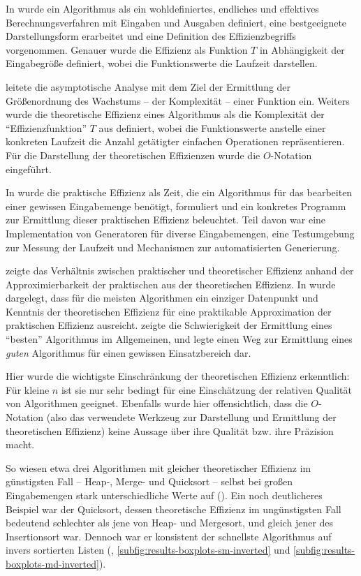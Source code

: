 In  wurde ein Algorithmus als ein wohldefiniertes, endliches und effektives Berechnungsverfahren mit Eingaben und Ausgaben definiert, eine bestgeeignete Darstellungsform erarbeitet und eine Definition des Effizienzbegriffs vorgenommen. Genauer wurde die Effizienz als Funktion $T$ in Abhängigkeit der Eingabegröße definiert, wobei die Funktionswerte die Laufzeit darstellen.

 leitete die asymptotische Analyse mit dem Ziel der Ermittlung der Größenordnung des Wachstums -- der Komplexität -- einer Funktion ein. Weiters wurde die theoretische Effizienz eines Algorithmus als die Komplexität der \enquote{Effizienzfunktion} $T$ aus  definiert, wobei die Funktionswerte anstelle einer konkreten Laufzeit die Anzahl getätigter einfachen Operationen repräsentieren. Für die Darstellung der theoretischen Effizienzen wurde die $O$-Notation eingeführt.

In  wurde die praktische Effizienz als Zeit, die ein Algorithmus für das bearbeiten einer gewissen Eingabemenge benötigt, formuliert und ein konkretes Programm zur Ermittlung dieser praktischen Effizienz beleuchtet. Teil davon war eine Implementation von Generatoren für diverse Eingabemengen, eine Testumgebung zur Messung der Laufzeit und Mechanismen zur automatisierten Generierung.

 zeigte das Verhältnis zwischen praktischer und theoretischer Effizienz anhand der Approximierbarkeit der praktischen aus der theoretischen Effizienz. In  wurde dargelegt, dass für die meisten Algorithmen ein einziger Datenpunkt und Kenntnis der theoretischen Effizienz für eine praktikable Approximation der praktischen Effizienz ausreicht.  zeigte die Schwierigkeit der Ermittlung eines \enquote{besten} Algorithmus im Allgemeinen, und legte einen Weg zur Ermittlung eines \emph{guten} Algorithmus für einen gewissen Einsatzbereich dar.

Hier wurde die wichtigste Einschränkung der theoretischen Effizienz erkenntlich: Für kleine $n$ ist sie nur sehr bedingt für eine Einschätzung der relativen Qualität von Algorithmen geeignet. Ebenfalls wurde hier offensichtlich, dass die $O$-Notation (also das verwendete Werkzeug zur Darstellung und Ermittlung der theoretischen Effizienz) keine Aussage über ihre Qualität bzw. ihre Präzision macht.

So wiesen etwa drei Algorithmen mit gleicher theoretischer Effizienz im günstigsten Fall -- Heap-, Merge- und Quicksort -- selbst bei großen Eingabemengen stark unterschiedliche Werte auf (). Ein noch deutlicheres Beispiel war der Quicksort, dessen theoretische Effizienz im ungünstigsten Fall bedeutend schlechter als jene von Heap- und Mergesort, und gleich jener des Insertionsort war. Dennoch war er konsistent der schnellste Algorithmus auf invers sortierten Listen (, \ref{subfig:results-boxplots-sm-inverted} und \ref{subfig:results-boxplots-md-inverted}).
